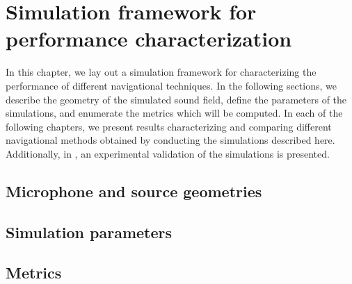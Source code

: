\chapter{Simulation framework for performance characterization}\label{chap:06_Simulation_Framework}
In this chapter, we lay out a simulation framework for characterizing the performance of different navigational techniques.
In the following sections, we describe the geometry of the simulated sound field, define the parameters of the simulations, and enumerate the metrics which will be computed.
In each of the following chapters, we present results characterizing and comparing different navigational methods obtained by conducting the simulations described here.
Additionally, in , an experimental validation of the simulations is presented.

\section{Microphone and source geometries}\label{sec:06_Simulation_Framework:Geometry}


\section{Simulation parameters}\label{sec:06_Simulation_Framework:Parameters}


\section{Metrics}\label{sec:06_Simulation_Framework:Metrics}
